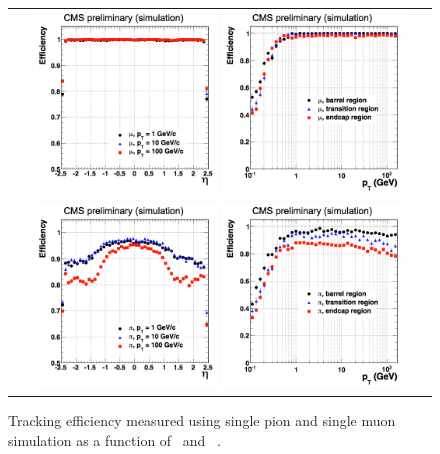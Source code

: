 \begin{figure}[htp] 
\centering 
\begin{tabular}{c} 
\includegraphics[width=0.45\textwidth]{figures/eff_muon_vs_eta.png} 
\includegraphics[width=0.45\textwidth]{figures/eff_muon_vs_pt.png} \\
\includegraphics[width=0.45\textwidth]{figures/eff_pion_vs_eta.png} 
\includegraphics[width=0.45\textwidth]{figures/eff_pion_vs_pt.png} 
\end{tabular}
\caption{Tracking efficiency measured using single pion 
and single muon simulation as a function of \pt\ and \Eta~\cite{TrkPerform}. 
} 
\label{fig:TrackingEffMC} 
\end{figure} 

